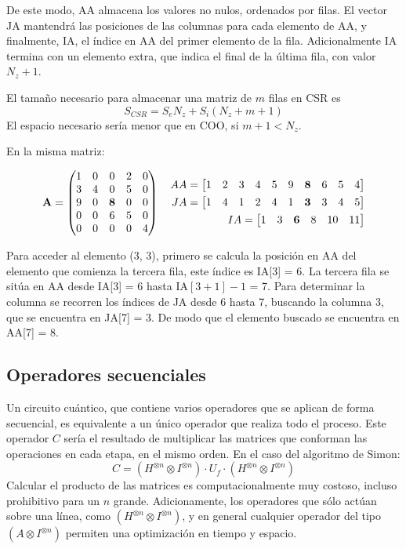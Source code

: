 De este modo, AA almacena los valores no nulos, ordenados por filas. El vector 
JA mantendrá las posiciones de las columnas para cada elemento de AA, y 
finalmente, IA, el índice en AA del primer elemento de la fila. Adicionalmente 
IA termina con un elemento extra, que indica el final de la última fila, con 
valor $N_z + 1$.

El tamaño necesario para almacenar una matriz de $m$ filas en CSR es
$$ S_{CSR} = S_e N_z + S_i (N_z + m + 1) $$
El espacio necesario sería menor que en COO, si $m + 1 < N_z$.

\begin{ejemplo} En la misma matriz:

$$ \textbf{A} = \begin{pmatrix} 
	1 & 0 & 0 & 2 & 0 \\
	3 & 4 & 0 & 5 & 0 \\
	9 & 0 & \textbf{8} & 0 & 0 \\
	0 & 0 & 6 & 5 & 0 \\
	0 & 0 & 0 & 0 & 4  \end{pmatrix}
\quad
\begin{aligned}
	AA = \begin{bmatrix}  1 & 2 & 3 & 4 & 5  & 9 & \textbf{8} & 6 & 5 & 4 \end{bmatrix} \\
	JA = \begin{bmatrix}  1 & 4 & 1 & 2 & 4  & 1 & \textbf{3} & 3 & 4 & 5 \end{bmatrix}\\
	IA = \begin{bmatrix}  1 & 3 & \textbf{6} & 8 & 10 & 11 \end{bmatrix}
\end{aligned}
$$

Para acceder al elemento (3, 3), primero se calcula la posición en AA del 
elemento que comienza la tercera fila, este índice es IA[3] = 6. La tercera fila 
se sitúa en AA desde IA[3] = 6 hasta IA$[3+1]-1$ = 7.  Para determinar la 
columna se recorren los índices de JA desde 6 hasta 7, buscando la columna 3, 
que se encuentra en JA[7] = 3. De modo que el elemento buscado se encuentra en 
AA[7] = 8.

\subsection{Operadores secuenciales}
Un circuito cuántico, que contiene varios operadores que se aplican de forma 
secuencial, es equivalente a un único operador que realiza todo el proceso. Este 
operador $C$ sería el resultado de multiplicar las matrices que conforman las 
operaciones en cada etapa, en el mismo orden. En el caso del algoritmo de Simon:
%
$$ C = (H^{\otimes n} \otimes I^{\otimes n}) \cdot U_f \cdot (H^{\otimes n} 
\otimes I^{\otimes n})$$
%
Calcular el producto de las matrices es computacionalmente muy costoso, incluso 
prohibitivo para un $n$ grande. Adicionamente, los operadores que sólo actúan 
sobre una línea, como $(H^{\otimes n} \otimes I^{\otimes n})$, y en general 
cualquier operador del tipo $(A \otimes I^{\otimes n})$ permiten una 
optimización en tiempo y espacio.


\end{ejemplo}
